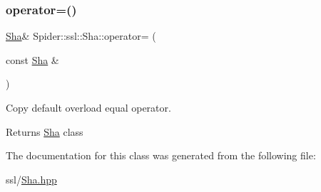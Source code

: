 \subsubsection{\texorpdfstring{operator=()}{operator=()}}
{\footnotesize\ttfamily \hyperlink{class_spider_1_1ssl_1_1_sha}{Sha}\& Spider\+::ssl\+::\+Sha\+::operator= (\begin{DoxyParamCaption}\item[{const \hyperlink{class_spider_1_1ssl_1_1_sha}{Sha} \&}]{ }\end{DoxyParamCaption})\hspace{0.3cm}{\ttfamily [delete]}}



Copy default overload equal operator. 

\begin{DoxyReturn}{Returns}
\hyperlink{class_spider_1_1ssl_1_1_sha}{Sha} class 
\end{DoxyReturn}


The documentation for this class was generated from the following file\+:\begin{DoxyCompactItemize}
\item 
ssl/\hyperlink{_sha_8hpp}{Sha.\+hpp}\end{DoxyCompactItemize}
